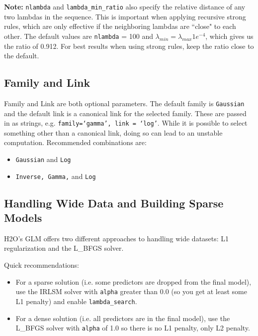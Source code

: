\textbf{Note:} \texttt{nlambda} and \texttt{lambda\_min\_ratio} also specify the relative distance of any two
 lambdas in the sequence. This is important when applying recursive strong rules, which are only effective if the
neighboring lambdas are ``close" to each other. The default values are \texttt{nlambda} = 100 and $\lambda_{min}
= \lambda_{max} 1e^{-4}$, which gives us the ratio of 0.912.  For best results when using strong rules, keep the
ratio close to the default.

\subsection{Family and Link}

Family and Link are both optional parameters. The default family is \texttt{Gaussian} and the default link is a
canonical link for the selected family. These are passed in as strings, e.g. \texttt{family=`gamma', link = `log'}.
While it is possible to select something other than a canonical link, doing so can lead to an unstable
computation. Recommended combinations are:

\begin{itemize}
\item \texttt{Gaussian} and \texttt{Log}
\item \texttt{Inverse, Gamma,} and \texttt{Log}
\end{itemize} 

\subsection{Handling Wide Data and Building Sparse Models}

H2O's GLM offers two different approaches to handling wide datasets:  L1 regularization and the L\_BFGS solver.

Quick recommendations:

\begin{itemize}
\item For a sparse solution (i.e. some predictors are dropped from the final model), use the IRLSM solver with 
      \texttt{alpha} greater than 0.0 (so you get at least some L1 penalty) and enable \texttt{lambda\_search}.

\item For a dense solution (i.e. all predictors are in the final model), use the L\_BFGS solver with
      \texttt{alpha} of 1.0 so there is no L1 penalty, only L2 penalty.
\end{itemize}

